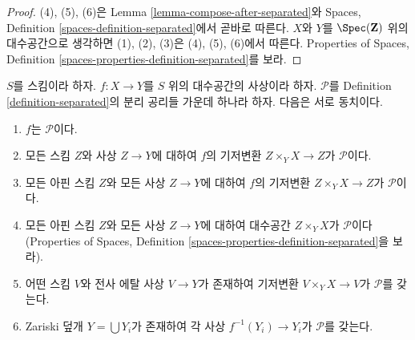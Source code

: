 \begin{proof}
(4), (5), (6)은 Lemma \ref{lemma-compose-after-separated}와
Spaces, Definition \ref{spaces-definition-separated}에서 곧바로 따른다.
$X$와 $Y$를 $\Spec(\mathbf{Z})$ 위의 대수공간으로 생각하면
(1), (2), (3)은 (4), (5), (6)에서 따른다.
Properties of Spaces, Definition
\ref{spaces-properties-definition-separated}를 보라.
\end{proof}

\begin{lemma}
\label{lemma-separated-local}
$S$를 스킴이라 하자.
$f : X \to Y$를 $S$ 위의 대수공간의 사상이라 하자.
$\mathcal{P}$를 Definition \ref{definition-separated}의 분리 공리들
가운데 하나라 하자. 다음은 서로 동치이다.
\begin{enumerate}
\item $f$는 $\mathcal{P}$이다.
\item 모든 스킴 $Z$와 사상 $Z \to Y$에 대하여 $f$의 기저변환
$Z \times_Y X \to Z$가 $\mathcal{P}$이다.
\item 모든 아핀 스킴 $Z$와 모든 사상 $Z \to Y$에 대하여 $f$의
기저변환 $Z \times_Y X \to Z$가 $\mathcal{P}$이다.
\item 모든 아핀 스킴 $Z$와 모든 사상 $Z \to Y$에 대하여
대수공간 $Z \times_Y X$가 $\mathcal{P}$이다(Properties of Spaces,
Definition \ref{spaces-properties-definition-separated}을 보라).
\item 어떤 스킴 $V$와 전사 에탈 사상 $V \to Y$가 존재하여
기저변환 $V \times_Y X \to V$가 $\mathcal{P}$를 갖는다.
\item Zariski 덮개 $Y = \bigcup Y_i$가 존재하여 각 사상
$f^{-1}(Y_i) \to Y_i$가 $\mathcal{P}$를 갖는다.
\end{enumerate}
\end{lemma}

